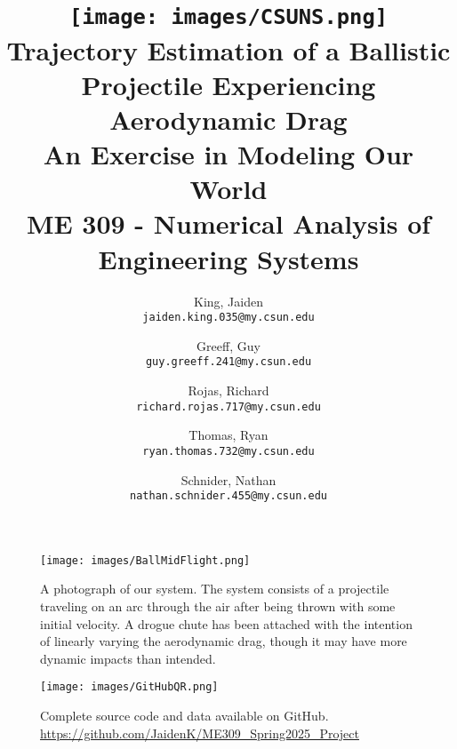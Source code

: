 \documentclass[12pt,english]{report}
\author{
	King, Jaiden\\
	\texttt{jaiden.king.035@my.csun.edu}
	\and
	Greeff, Guy\\
	\texttt{guy.greeff.241@my.csun.edu}
	\and
	Rojas, Richard\\
	\texttt{richard.rojas.717@my.csun.edu}
	\and
	Thomas, Ryan\\
	\texttt{ryan.thomas.732@my.csun.edu}
	\and
	Schnider, Nathan\\
	\texttt{nathan.schnider.455@my.csun.edu}
}
\title{\texttt{[image: images/CSUNS.png]}\\
Trajectory Estimation of a Ballistic Projectile Experiencing Aerodynamic Drag\\\large{An Exercise in Modeling Our World\\ME 309 - Numerical Analysis of Engineering Systems}}
\begin{document}
\maketitle

\tableofcontents

\begin{figure}[t]
\centering
\texttt{[image: images/BallMidFlight.png]}
\caption{\label{fig:BallMidFlight} A photograph of our system. The system consists of a projectile traveling on an arc through the air after being thrown with some initial velocity. A drogue chute has been attached with the intention of linearly varying the aerodynamic drag, though it may have more dynamic impacts than intended.}
\end{figure}

\begin{figure}[t]
\centering
\texttt{[image: images/GitHubQR.png]}
\caption{\label{fig:GitHubQR} Complete source code and data available on GitHub. \href{https://github.com/JaidenK/ME309\_Spring2025\_Project}{https://github.com/JaidenK/ME309\_Spring2025\_Project}}
\end{figure}
















\end{document}
